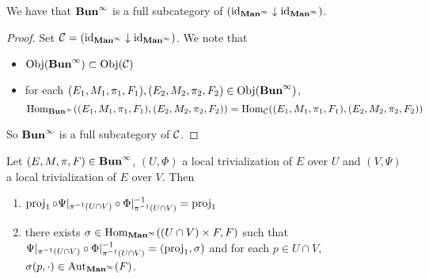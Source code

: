 \documentclass{book}
\begin{document}
	\begin{ex} 
		We have that $\Buninf$ is a full subcategory of $(\id_{\Maninf} \downarrow \id_{\Maninf})$.
	\end{ex}
	
	\begin{proof} Set $\MC = (\id_{\Maninf} \downarrow \id_{\Maninf})$. We note that 
		\begin{itemize}
			\item $\Obj(\Buninf) \subset \Obj(\MC)$
			\item for each $(E_1, M_1, \pi_1, F_1), (E_2, M_2, \pi_2, F_2) \in \Obj(\Buninf)$, 
			$$\Hom_{\Buninf}((E_1, M_1, \pi_1, F_1), (E_2, M_2, \pi_2, F_2)) = \Hom_{\MC}((E_1, M_1, \pi_1, F_1), (E_2, M_2, \pi_2, F_2))$$
		\end{itemize}
		So $\Buninf$ is a full subcategory of $\MC$.
	\end{proof}


	\begin{ex} 
		Let $(E, M, \pi, F) \in \Buninf$, $(U, \Phi)$ a local trivialization of $E$ over $U$ and $(V, \Psi)$ a local trivialization of $E$ over $V$. Then 
		\begin{enumerate}
			\item $\prj_1 \circ \Psi|_{\pi^{-1}(U \cap V)} \circ \Phi|^{-1}_{\pi^{-1}(U \cap V)} = \prj_1$
			\item there exists $\sig \in \Hom_{\Maninf}(( U \cap V) \times F,  F)$ such that $\Psi|_{\pi^{-1}(U \cap V)} \circ \Phi|^{-1}_{\pi^{-1}(U \cap V)} = (\prj_1, \sig)$ and for each $p \in U \cap V$, $\sig(p, \cdot) \in \Aut_{\Maninf}(F)$.  
		\end{enumerate}
	\end{ex}
\end{document}
